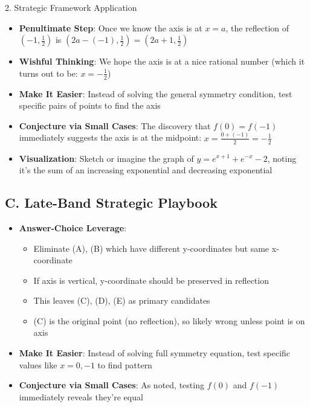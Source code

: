 \documentclass[12pt]{article}
\begin{document}
\begin{strategybox}{2. Strategic Framework Application}
\begin{itemize}[leftmargin=*]
    \item \textbf{Penultimate Step}: Once we know the axis is at $x = a$, the reflection of $(-1, \frac{1}{2})$ is $(2a - (-1), \frac{1}{2}) = (2a + 1, \frac{1}{2})$
    
    \item \textbf{Wishful Thinking}: We hope the axis is at a nice rational number (which it turns out to be: $x = -\frac{1}{2}$)
    
    \item \textbf{Make It Easier}: Instead of solving the general symmetry condition, test specific pairs of points to find the axis
    
    \item \textbf{Conjecture via Small Cases}: The discovery that $f(0) = f(-1)$ immediately suggests the axis is at the midpoint: $x = \frac{0 + (-1)}{2} = -\frac{1}{2}$
    
    \item \textbf{Visualization}: Sketch or imagine the graph of $y = e^{x+1} + e^{-x} - 2$, noting it's the sum of an increasing exponential and decreasing exponential
\end{itemize}

\subsection*{C. Late-Band Strategic Playbook}
\begin{itemize}[leftmargin=*]
    \item \textbf{Answer-Choice Leverage}: 
    \begin{itemize}
        \item Eliminate (A), (B) which have different y-coordinates but same x-coordinate
        \item If axis is vertical, y-coordinate should be preserved in reflection
        \item This leaves (C), (D), (E) as primary candidates
        \item (C) is the original point (no reflection), so likely wrong unless point is on axis
    \end{itemize}
    
    \item \textbf{Make It Easier}: Instead of solving full symmetry equation, test specific values like $x = 0, -1$ to find pattern
    
    \item \textbf{Conjecture via Small Cases}: As noted, testing $f(0)$ and $f(-1)$ immediately reveals they're equal
\end{itemize}


\end{strategybox}
\end{document}
